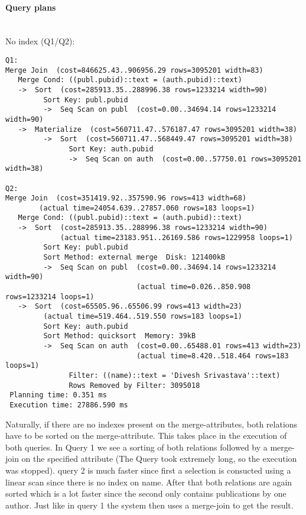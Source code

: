 \documentclass[11pt]{scrartcl}
\begin{document}
\paragraph{Query plans}\mbox{}\\ 

\noindent No index (Q1/Q2):
{\small
\begin{verbatim}
Q1:
Merge Join  (cost=846625.43..906956.29 rows=3095201 width=83)
   Merge Cond: ((publ.pubid)::text = (auth.pubid)::text)
   ->  Sort  (cost=285913.35..288996.38 rows=1233214 width=90)
         Sort Key: publ.pubid
         ->  Seq Scan on publ  (cost=0.00..34694.14 rows=1233214 width=90)
   ->  Materialize  (cost=560711.47..576187.47 rows=3095201 width=38)
         ->  Sort  (cost=560711.47..568449.47 rows=3095201 width=38)
               Sort Key: auth.pubid
               ->  Seq Scan on auth  (cost=0.00..57750.01 rows=3095201 width=38)

Q2:
Merge Join  (cost=351419.92..357590.96 rows=413 width=68) 
	    (actual time=24054.639..27857.060 rows=183 loops=1)
   Merge Cond: ((publ.pubid)::text = (auth.pubid)::text)
   ->  Sort  (cost=285913.35..288996.38 rows=1233214 width=90) 
             (actual time=23183.951..26169.586 rows=1229958 loops=1)
         Sort Key: publ.pubid
         Sort Method: external merge  Disk: 121400kB
         ->  Seq Scan on publ  (cost=0.00..34694.14 rows=1233214 width=90) 
                               (actual time=0.026..850.908 rows=1233214 loops=1)
   ->  Sort  (cost=65505.96..65506.99 rows=413 width=23) 
	     (actual time=519.464..519.550 rows=183 loops=1)
         Sort Key: auth.pubid
         Sort Method: quicksort  Memory: 39kB
         ->  Seq Scan on auth  (cost=0.00..65488.01 rows=413 width=23) 
                               (actual time=8.420..518.464 rows=183 loops=1)
               Filter: ((name)::text = 'Divesh Srivastava'::text)
               Rows Removed by Filter: 3095018
 Planning time: 0.351 ms
 Execution time: 27886.590 ms
\end{verbatim}
Naturally, if there are no indexes present on the merge-attributes, both relations have to be sorted on the merge-attribute. This takes place in the execution of both queries.
In Query 1 we see a sorting of both relations followed by a merge-join on the specified attribute (The Query took extremely long, so the execution was stopped).
query 2 is much faster since first a selection is consucted using a linear scan since there is no index on name. After that both relations are again sorted which is a lot faster
since the second only contains publications by one author. Just like in query 1 the system then uses a merge-join to get the result.
}
\end{document}
